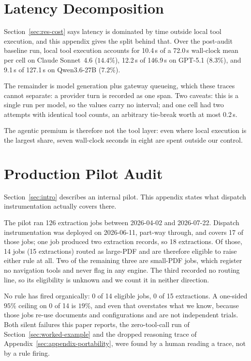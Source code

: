 \documentclass[11pt]{article}
\begin{document}
\section{Latency Decomposition}
\label{sec:appendix-latency}

Section~\ref{sec:res-cost} says latency is dominated by time outside
local tool execution, and this appendix gives the split behind that. Over the post-audit baseline
run, local tool execution accounts for 10.4\,s of a 72.0\,s wall-clock
mean per cell on Claude Sonnet~4.6 ($14.4\%$), 12.2\,s of 146.9\,s on
GPT-5.1 ($8.3\%$), and 9.1\,s of 127.1\,s on Qwen3.6-27B ($7.2\%$).

The remainder is model generation plus gateway queueing, which these
traces cannot separate: a provider turn is recorded as one span. Two
caveats: this is a single run per model, so the values carry no
interval; and one cell had two attempts with identical tool counts, an
arbitrary tie-break worth at most 0.2\,s.

The agentic premium is therefore not the tool layer: even where local
execution is the largest share, seven wall-clock seconds in eight are
spent outside our control.

\section{Production Pilot Audit}
\label{sec:appendix-pilot}

Section~\ref{sec:intro} describes an internal pilot. This appendix
states what dispatch instrumentation actually covers there.

The pilot ran 126 extraction jobs between 2026-04-02 and 2026-07-22.
Dispatch instrumentation was deployed on 2026-06-11, part-way through,
and covers 17 of those jobs; one job produced two extraction records,
so 18 extractions. Of those, 14 jobs (15 extractions) routed as
large-PDF and are therefore eligible to raise either rule at all. Two
of the remaining three are small-PDF jobs, which register no navigation
tools and never flag in any engine. The third recorded no routing line,
so its eligibility is unknown and we count it in neither direction.

No rule has fired organically: 0 of 14 eligible jobs, 0 of 15
extractions. A one-sided $95\%$ ceiling on 0 of 14 is $19\%$, and even that
overstates what we know, because those jobs re-use documents and
configurations and are not independent trials. Both silent failures this
paper reports, the zero-tool-call run of Section~\ref{sec:worked-example}
and the dropped reasoning trace of
Appendix~\ref{sec:appendix-portability}, were found by a human reading
a trace, not by a rule firing.
\end{document}
